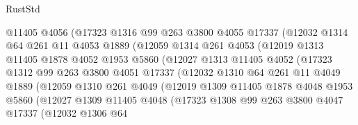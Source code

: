 \begin{lexlean}{RustStd}
\begin{coremodule}
{\begin{coremodule}
{{{{{{{{{{{{{{{{{{{{{{{{{{{{{                    @11405
                    @4056
                    (@17323
                      @1316
                      @99
                      @263
                      @3800
                      @4055
                      @17337
                      (@12032
                        @1314
                        @64
                        @261
                        @11
                        @4053
                        @1889
                        (@12059
                          @1314
                          @261
                          @4053
                          (@12019
                            @1313
                            @11405
                            @1878
                            @4052
                            @1953
                            @5860
                            (@12027
                              @1313
                              @11405
                              @4052
                              (@17323
                                @1312
                                @99
                                @263
                                @3800
                                @4051
                                @17337
                                (@12032
                                  @1310
                                  @64
                                  @261
                                  @11
                                  @4049
                                  @1889
                                  (@12059
                                    @1310
                                    @261
                                    @4049
                                    (@12019
                                      @1309
                                      @11405
                                      @1878
                                      @4048
                                      @1953
                                      @5860
                                      (@12027
                                        @1309
                                        @11405
                                        @4048
                                        (@17323
                                          @1308
                                          @99
                                          @263
                                          @3800
                                          @4047
                                          @17337
                                          (@12032
                                            @1306
                                            @64
}}}}}}}}}}}}}}}}}}}}}}}}}}}}}
\end{coremodule}}
\end{coremodule}
\end{lexlean}
